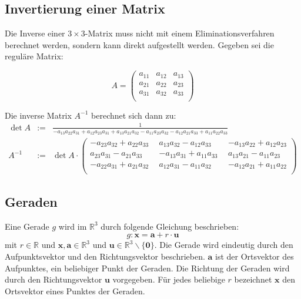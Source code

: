 \subsection{Invertierung einer Matrix}
\label{anhang_b_matrix_inversion}
Die Inverse einer $3\times3$-Matrix muss nicht mit einem Eliminationsverfahren berechnet werden, sondern kann direkt aufgestellt werden. Gegeben sei die reguläre Matrix:

\begin{equation}
A =
\left(
\begin{array}{ccc}
a_{11} & a_{12} & a_{13}\\
a_{21} & a_{22} & a_{23}\\
a_{31} & a_{32} & a_{33}\\
\end{array}
\right)
\end{equation}

Die inverse Matrix $A^{-1}$ berechnet sich dann zu:
{\small
\begin{eqnarray}
\det{A} &:=& \frac{1}{-a_{13}a_{22}a_{31} + a_{12}a_{23}a_{31} + a_{13}a_{21}a_{32} - a_{11}a_{23}a_{32} - a_{12}a_{21}a_{33} + a_{11}a_{22}a_{33}}\nonumber\\
A^{-1}&:=&\det{A}\cdot
\left(
\begin{array}{ccc}
-a_{23}a_{32} + a_{22}a_{33}\ \ & a_{13}a_{32} - a_{12}a_{33}\ \ & -a_{13}a_{22} + a_{12}a_{23}\\
a_{23}a_{31} - a_{21}a_{33}\ \ & -a_{13}a_{31} + a_{11}a_{33}\ \ & a_{13}a_{21} - a_{11}a_{23}\\
-a_{22}a_{31} + a_{21}a_{32}\ \ & a_{12}a_{31} - a_{11}a_{32}\ \ & -a_{12}a_{21} + a_{11}a_{22}\\
\end{array}
\right)%
\end{eqnarray}
}

\subsection{Geraden}
Eine Gerade $g$ wird im $\mathbb{R}^3$ durch folgende Gleichung beschrieben:
$$
g : \bm{x} = \bm{a} + r\cdot\bm{u} \nonumber
$$
mit $r \in \mathbb{R}$ und $\bm{x}, \bm{a} \in \mathbb{R}^3$ und $\bm{u} \in \mathbb{R}^3\backslash\{\bm{0}\}$. Die Gerade wird eindeutig durch den Aufpunktsvektor und den Richtungsvektor beschrieben. $\bm{a}$ ist der Ortsvektor des Aufpunktes, ein beliebiger Punkt der Geraden. Die Richtung der Geraden wird durch den Richtungsvektor $\bm{u}$ vorgegeben. Für jedes beliebige $r$ bezeichnet $\bm{x}$ den Ortsvektor eines Punktes der Geraden.\\

